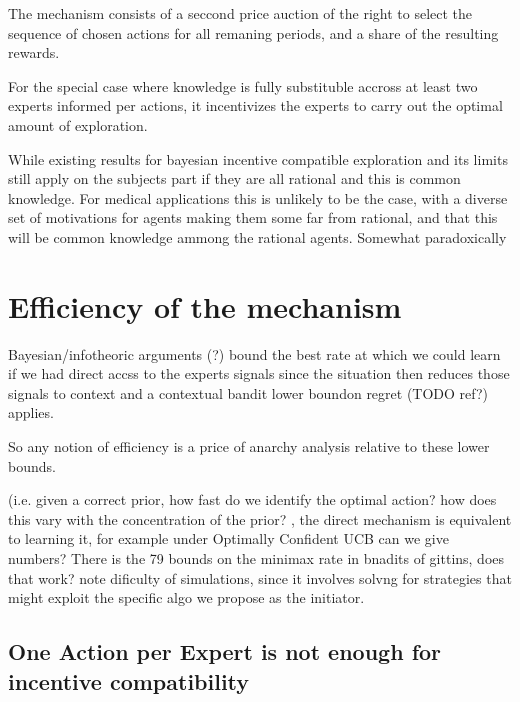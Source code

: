 The mechanism consists of a seccond price auction of the right to select the sequence of chosen actions for all remaning periods, and a share of the resulting rewards.

For the special case where knowledge is  fully substituble accross at least two experts informed per actions, it incentivizes the experts to carry out the optimal amount of exploration. 

While existing results for bayesian incentive compatible exploration and its limits still apply on the subjects part if they are all rational and this is common knowledge. For medical applications this is unlikely to be the case, with a diverse set of motivations for agents making them some far from rational, and that this will be common knowledge ammong the rational agents. Somewhat paradoxically 






\section{Efficiency of the mechanism}



Bayesian/infotheoric arguments  (?)  bound the best rate at which we could learn if we had direct accss to the experts signals since the situation then reduces those signals to context and a contextual bandit lower boundon regret (TODO ref?) applies. 

So any notion of efficiency is a price of anarchy analysis relative to these lower bounds. 

(i.e. given a correct prior, how fast do we identify the optimal action? how does this vary with the concentration of the prior? , the direct mechanism is equivalent to learning it, for example under Optimally Confident UCB can we give numbers? There is the 79 bounds on the minimax rate in bnadits of gittins, does that work? note dificulty of simulations, since it involves solvng for strategies that might exploit the specific algo we propose as the initiator.

\subsection{One Action per Expert is not enough for incentive compatibility}


